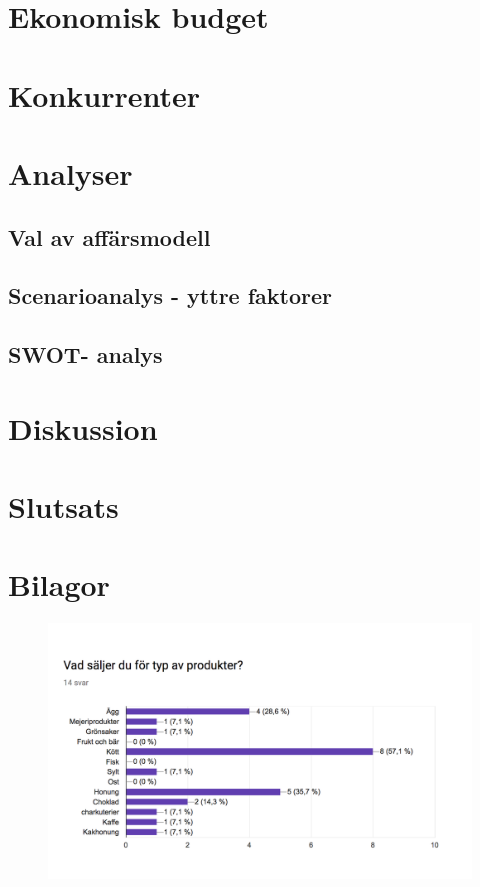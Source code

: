 \documentclass[10pt,a4paper,oneside]{article}
\begin{document}
\section{Ekonomisk budget}
\newpage

\section{Konkurrenter}
\newpage

\section{Analyser}
\subsection{Val av affärsmodell}
\subsection{Scenarioanalys  - yttre faktorer}
\subsection{SWOT- analys}
\newpage

\section{Diskussion}
\newpage

\section{Slutsats}
\newpage



\newpage

\section*{Bilagor}

\begin{figure}[H]
	\includegraphics[scale=0.6]{1.png}
\end{figure}
\end{document}
